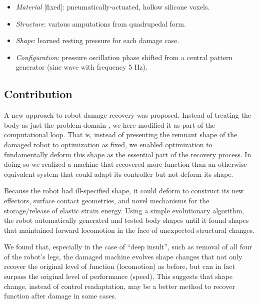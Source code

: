 \begin{itemize}
    \item \textit{Material} [fixed]: pneumatically-actuated, hollow silicone voxels.
    \item \textit{Structure}: 
    various amputations from quadrupedal form.
    \item \textit{Shape}: learned resting pressure for each damage case.
    \item \textit{Configuration}: pressure oscillation phase shifted from a central pattern generator (sine wave with frequency 5 Hz).
\end{itemize}



\subsection{Contribution}



A new approach to robot damage recovery was proposed.
Instead of treating the body as just the problem domain \cite{bongard2006resilient,cully2015robots}, we here modified it as part of the computational loop.
That is, 
instead of presenting the remnant shape of the damaged robot to optimization as 
fixed, we enabled optimization to fundamentally deform this shape as the essential part of the recovery process.
In doing so we realized a machine that recovered more function than an otherwise equivalent system that could adapt its controller but not deform its shape.

Because the robot had ill-specified shape,
it could deform to construct its new effectors, surface contact geometries, and novel mechanisms for the storage/release of elastic strain energy.
Using a simple evolutionary algorithm, 
the robot automatically generated and tested body shapes until it found shapes that maintained forward locomotion in the face of unexpected structural changes.

We found that, especially in the case of ``deep insult'', such as removal of all four of the robot's legs, the damaged machine evolves shape changes that not only recover the original level of function (locomotion) as before, but can in fact surpass the original level of performance (speed).
This suggests that shape change, instead of control readaptation, may be a better method to recover function after damage in some cases.

